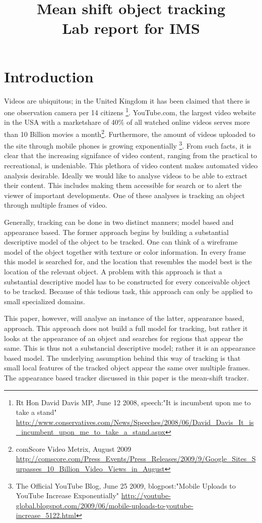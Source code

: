 \documentclass[a4paper,11pt]{article}
\title{Mean shift object tracking\\ Lab report for IMS}
\date{}
\begin{document}
\maketitle 

\section{Introduction}
	Videos are ubiquitous; in the United Kingdom it has been claimed that there is one observation camera per 14 citizens \footnote{
Rt Hon David Davis MP, June 12 2008, speech:"It is incumbent upon me to take a stand" 
\url{http://www.conservatives.com/News/Speeches/2008/06/David_Davis_It_is_incumbent_upon_me_to_take_a_stand.aspx}
}. YouTube.com, the largest video website in the USA with a marketshare of 40\% of all watched online videos serves more than 10 Billion movies a month\footnote{comScore Video Metrix, August 2009 
\url{http://comscore.com/Press_Events/Press_Releases/2009/9/Google_Sites_Surpasses_10_Billion_Video_Views_in_August}}.
	Furthermore, the amount of videos uploaded to the site through mobile phones is growing exponentially \footnote{The Official YouTube Blog, June 25 2009, blogpost:"Mobile Uploads to YouTube Increase Exponentially" 
\url{http://youtube-global.blogspot.com/2009/06/mobile-uploads-to-youtube-increase_5122.html}}. 
	From such facts, it is clear that the increasing signifance of video content, ranging from the practical to recreational, is undeniable. This plethora of video content makes automated video analysis desirable. Ideally we would like to analyse videos to be able to extract their content. This includes making them accessible for search or to alert the viewer of important developments. One of these analyses is tracking an object through multiple frames of video.

Generally, tracking can be done in two distinct manners; model based and appearance based. 
The former approach begins by building a substantial descriptive model of the object to be tracked. One can think of a wireframe model of the object together with texture or color information. In every frame this model is searched for, and the location that resembles the model best is the location of the relevant object.  A problem with this approach is that a substantial descriptive model has to be constructed for every conceivable object to be tracked.  Because of this tedious task, this approach can only be applied to small specialized domains.  

This paper, however, will analyse an instance of the latter, appearance based, approach. This approach does not build a full model for tracking, but rather it looks at the appearance of an object and searches for regions that appear the same.  This is thus not a substancial descriptive model; rather it is an appearance based model. The underlying assumption behind this way of tracking is that small local features of the tracked object appear the same over multiple frames. %
The appearance based tracker discussed in this paper is the mean-shift tracker. 
\end{document}
